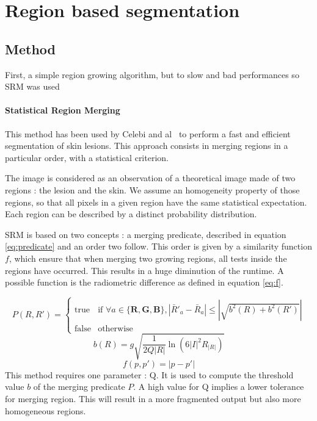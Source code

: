 \documentclass[a4paper,10pt]{article}
\begin{document}
\section{Region based segmentation}
\subsection{Method}
First, a simple region growing algorithm, but to slow and bad performances so SRM was used
\paragraph{ Statistical Region Merging~\cite{nock_statistical_2004} } This method has been 
used by Celebi and al~\cite{celebi_border_2008} to perform a fast and efficient 
segmentation of skin lesions. This approach consists in merging regions in a particular order, with a statistical criterion.

The image is considered as an observation of a theoretical image made of two regions : the lesion and the skin. We assume an homogeneity property of those regions, so that all pixels in a given region have the same statistical expectation. Each region can be described by a distinct probability distribution. 

SRM is based on two concepts : a merging predicate, described in equation \ref{eq:predicate} and an order two follow. This order is given by a similarity function $f$, which ensure that when merging two growing regions, all tests inside the regions have occurred. This results in a huge diminution of the runtime. A possible function is the radiometric difference as defined in equation \ref{eq:f}.

\begin{equation}
P(R,R')= 
\begin{cases}
\text{true} & \text{if } \forall a \in \lbrace \mathbf{R,G,B} \rbrace, |\bar{R}'_a - \bar{R}_a| \leq |\sqrt{b^2(R) + b^2(R')}|  \\
\text{false} & \text{otherwise}
\end{cases}
\label{eq:predicate}
\end{equation}
$$
b(R)=g \sqrt{\frac{1}{2Q|R|}\ln (6|I|^2R_{|R|})}
$$
\begin{equation}
f(p,p')=|p-p'| 
\label{eq:f}
\end{equation}
This method requires one parameter : Q. It is used to compute the threshold value $b$ of the merging predicate $P$. A high value for Q implies a lower tolerance for merging region. This will result in a more fragmented output but also more homogeneous regions. 
\end{document}
